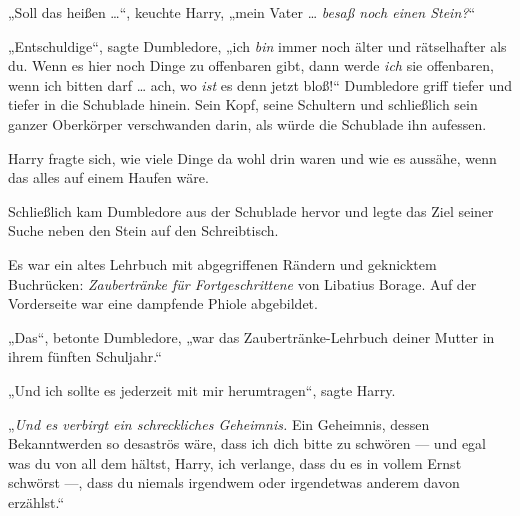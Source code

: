„Soll das heißen …“, keuchte Harry, „mein Vater … \emph{besaß noch einen Stein?}“

„Entschuldige“, sagte Dumbledore, „ich \emph{bin} immer noch älter und rätselhafter als du. Wenn es hier noch Dinge zu offenbaren gibt, dann werde \emph{ich} sie offenbaren, wenn ich bitten darf … ach, wo \emph{ist} es denn jetzt bloß!“ Dumbledore griff tiefer und tiefer in die Schublade hinein. Sein Kopf, seine Schultern und schließlich sein ganzer Oberkörper verschwanden darin, als würde die Schublade ihn aufessen.

Harry fragte sich, wie viele Dinge da wohl drin waren und wie es aussähe, wenn das alles auf einem Haufen wäre.

Schließlich kam Dumbledore aus der Schublade hervor und legte das Ziel seiner Suche neben den Stein auf den Schreibtisch.

Es war ein altes Lehrbuch mit abgegriffenen Rändern und geknicktem Buchrücken: \emph{Zaubertränke für Fortgeschrittene} von Libatius Borage. Auf der Vorderseite war eine dampfende Phiole abgebildet.

„Das“, betonte Dumbledore, „war das Zaubertränke-Lehrbuch deiner Mutter in ihrem fünften Schuljahr.“

„Und ich sollte es jederzeit mit mir herumtragen“, sagte Harry.

„\emph{Und es verbirgt ein schreckliches Geheimnis.} Ein Geheimnis, dessen Bekanntwerden so desaströs wäre, dass ich dich bitte zu schwören — und egal was du von all dem hältst, Harry, ich verlange, dass du es in vollem Ernst schwörst —, dass du niemals irgendwem oder irgendetwas anderem davon erzählst.“

